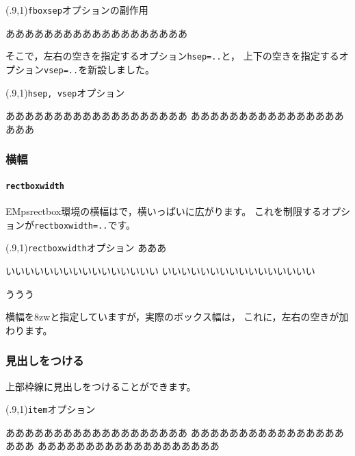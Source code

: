 \documentclass[a4j]{jarticle}
\begin{document}
\begin{showEx}(.9,1){\texttt{fboxsep}オプションの副作用}
\begin{EMpsrectbox}[fboxsep=1zw]
あああああああああああああああああああ

\end{EMpsrectbox}
\end{showEx}

そこで，左右の空きを指定するオプション\verb+hsep=..+と，
上下の空きを指定するオプション\verb+vsep=..+を新設しました。

\begin{showEx}(.9,1){\texttt{hsep, vsep}オプション}
\begin{EMpsrectbox}[hsep=3zw,vsep=1zw]
あああああああああああああああああああ
あああああああああああああああああああ

\end{EMpsrectbox}
\end{showEx}

\subsubsection{横幅}
\paragraph{\texttt{rectboxwidth}}
\textsf{EMpsrectbox}環境の横幅はで，横いっぱいに広がります。
これを制限するオプションが\verb+rectboxwidth=..+です。

\begin{showEx}(.9,1){\texttt{rectboxwidth}オプション}
あああ
\begin{EMpsrectbox}[rectboxwidth=8zw]
いいいいいいいいいいいいいいいい
いいいいいいいいいいいいいいいい
\end{EMpsrectbox}
ううう
\end{showEx}

横幅を8zwと指定していますが，実際のボックス幅は，
これに，左右の空きが加わります。

\subsubsection{見出しをつける}
上部枠線に見出しをつけることができます。

\begin{showEx}(.9,1){\texttt{item}オプション}
\begin{EMpsrectbox}[item={~見出し~}]
あああああああああああああああああああ
あああああああああああああああああああ
あああああああああああああああああああ
\end{EMpsrectbox}
\end{showEx}
\end{document}
